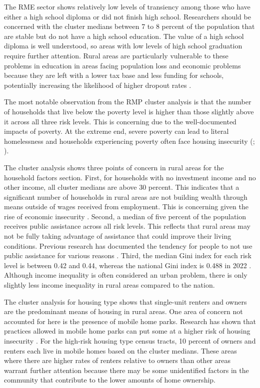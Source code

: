The RME sector shows relatively low levels of transiency among those who have either a high school diploma or did not finish high school. Researchers should be concerned with the cluster medians between 7 to 8 percent of the population that are stable but do not have a high school education. The value of a high school diploma is well understood, so areas with low levels of high school graduation require further attention. Rural areas are particularly vulnerable to these problems in education in areas facing population loss and economic problems because they are left with a lower tax base and less funding for schools, potentially increasing the likelihood of higher dropout rates \citep{blank_poverty_2005}.
 
The most notable observation from the RMP cluster analysis is that the number of households that live below the poverty level is higher than those slightly above it across all three risk levels. This is concerning due to the well-documented impacts of poverty. At the extreme end, severe poverty can lead to literal homelessness and households experiencing poverty often face housing insecurity (\citealp{evans_reducing_2019}; \citealp{cox_road_2019}). 
 
 The cluster analysis shows three points of concern in rural areas for the household factors section. First, for households with no investment income and no other income, all cluster medians are above 30 percent. This indicates that a significant number of households in rural areas are not building wealth through means outside of wages received from employment. This is concerning given the rise of economic insecurity \citep{desmond_housing_2016-1}. Second, a median of five percent of the population receives public assistance across all risk levels. This reflects that rural areas may not be fully taking advantage of assistance that could improve their living conditions. Previous research has documented the tendency for people to not use public assistance for various reasons \citep{lichter_changing_2007}. Third, the median Gini index for each risk level is between 0.42 and 0.44, whereas the national Gini index is 0.488 in 2022 \citep{us_census_bureau_income_2023}. Although income inequality is often considered an urban problem, there is only slightly less income inequality in rural areas compared to the nation.

The cluster analysis for housing type shows that single-unit renters and owners are the predominant means of housing in rural areas. One area of concern not accounted for here is the presence of mobile home parks. Research has shown that practices allowed in mobile home parks can put some at a higher risk of housing insecurity \citep{mactavish_policy_2006}. For the high-risk housing type census tracts, 10 percent of owners and renters each live in mobile homes based on the cluster medians. These areas where there are higher rates of renters relative to owners than other areas warrant further attention because there may be some unidentified factors in the community that contribute to the lower amounts of home ownership. 

